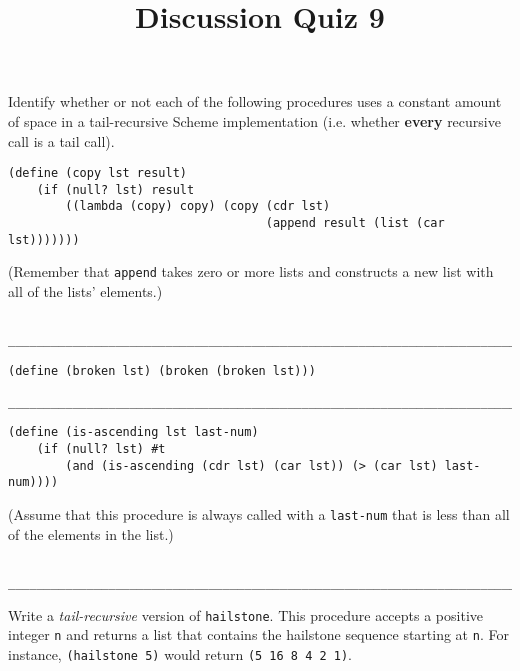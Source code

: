 \documentclass[twoside]{article}
\title{\sc Discussion Quiz 9 \solution{Solutions}}
\begin{document}
\thispagestyle{empty}
\maketitle

\begin{enumerate}

Identify whether or not each of the following procedures uses a constant amount of space in a tail-recursive Scheme implementation (i.e. whether \textbf{every} recursive call is a tail call).

\begin{lstlisting}
(define (copy lst result)
    (if (null? lst) result
        ((lambda (copy) copy) (copy (cdr lst)
                                    (append result (list (car lst)))))))
\end{lstlisting}

(Remember that {\tt append} takes zero or more lists and constructs a new list with all of the lists' elements.)
\begin{lstlisting}

__________________________________________________________________________
\end{lstlisting}

\begin{lstlisting}
(define (broken lst) (broken (broken lst)))
\end{lstlisting}
\vspace{0.21cm}
\begin{lstlisting}
__________________________________________________________________________
\end{lstlisting}

\begin{lstlisting}
(define (is-ascending lst last-num)
    (if (null? lst) #t
        (and (is-ascending (cdr lst) (car lst)) (> (car lst) last-num))))
\end{lstlisting}

(Assume that this procedure is always called with a {\tt last-num} that is less than all of the elements in the list.)
\begin{lstlisting}

__________________________________________________________________________
\end{lstlisting}


Write a \emph{tail-recursive} version of {\tt hailstone}. This procedure accepts a positive integer {\tt n} and returns a list that contains the hailstone sequence starting at {\tt n}. For instance, {\tt (hailstone 5)} would return {\tt (5 16 8 4 2 1)}.


\end{enumerate}
\end{document}
